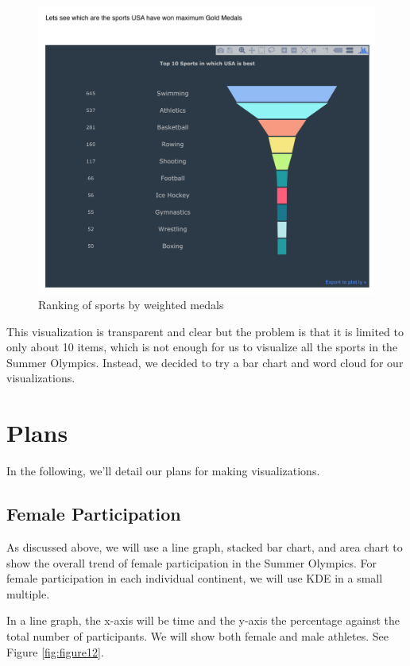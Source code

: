 \documentclass[
]{article}
\begin{document}
\begin{figure}

{\centering \includegraphics[width=0.9\linewidth]{static/pics/4-1} 

}

\caption{Ranking of sports by weighted medals}\label{fig:figure11}
\end{figure}

This visualization is transparent and clear but the problem is that it is limited to only about 10 items, which is not enough for us to visualize all the sports in the Summer Olympics. Instead, we decided to try a bar chart and word cloud for our visualizations.

\hypertarget{plans}{%
\section{Plans}\label{plans}}

In the following, we'll detail our plans for making visualizations.

\hypertarget{plans-female}{%
\subsection{Female Participation}\label{plans-female}}

As discussed above, we will use a line graph, stacked bar chart, and area chart to show the overall trend of female participation in the Summer Olympics. For female participation in each individual continent, we will use KDE in a small multiple.

In a line graph, the x-axis will be time and the y-axis the percentage against the total number of participants. We will show both female and male athletes. See Figure \ref{fig:figure12}.
\end{document}
